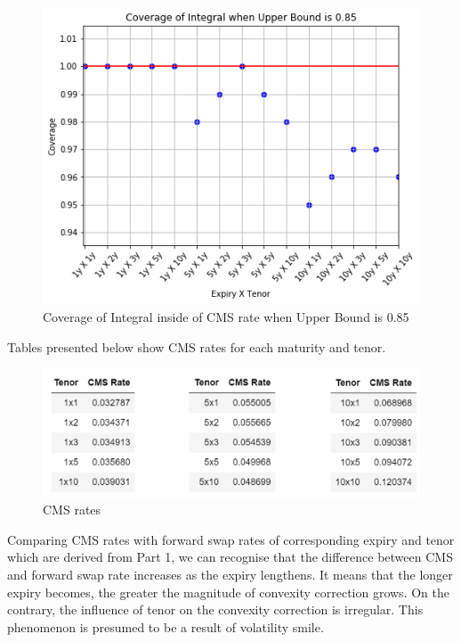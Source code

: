 \documentclass{article}
\begin{document}
	\begin{figure}[h]
		\centering
		\includegraphics[scale=0.5]{Coverage.png}
		\caption{Coverage of Integral inside of CMS rate when Upper Bound is 0.85}
	\end{figure}
	
	Tables presented below show CMS rates for each maturity and tenor. 
	
	\begin{figure}[h]
		\centering
		\includegraphics[scale=0.5]{CMS_RATE.png}
		\caption{CMS rates}
	\end{figure}
	
	\pagebreak
	
	 \noindent Comparing CMS rates with forward swap rates of corresponding expiry and tenor which are derived from Part 1, we can recognise that the difference between CMS and forward swap rate increases as the expiry lengthens. It means that the longer expiry becomes, the greater the magnitude of convexity correction grows. On the contrary, the influence of tenor on the convexity correction is irregular. This phenomenon is presumed to be a result of volatility smile. 
\end{document}
